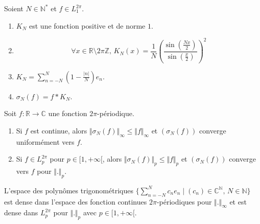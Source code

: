 	\begin{proposition}
		Soient $N \in \mathbb{N}^*$ et $f \in L_1^{2 \pi}$.
		\begin{enumerate}[label=(\roman*)]
			\item $K_N$ est une fonction positive et de norme $1$.
			\item \[ \forall x \in \mathbb{R} \setminus 2 \pi \mathbb{Z}, \, K_N(x) = \frac{1}{N} \left(\frac{\sin \left( \frac{Nx}{2} \right)}{\sin \left( \frac{x}{2} \right)}\right)^2 \]
			\item $K_N = \sum_{n=-N}^{N} \left(1 - \frac{\vert n \vert}{N}\right) e_n$.
			\item $\sigma_N(f) = f * K_N$.
		\end{enumerate}
	\end{proposition}


	\begin{theorem}[Fejér]
		Soit $f : \mathbb{R} \rightarrow \mathbb{C}$ une fonction $2\pi$-périodique.
		\begin{enumerate}[label=(\roman*)]
			\item Si $f$ est continue, alors $\Vert \sigma_N(f) \Vert_\infty \leq \Vert f \Vert_\infty$ et $(\sigma_N(f))$ converge uniformément vers $f$.
			\item Si $f \in L_p^{2\pi}$ pour $p \in [1,+\infty[$, alors $\Vert \sigma_N(f) \Vert_p \leq \Vert f \Vert_p$ et $(\sigma_N(f))$ converge vers $f$ pour $\Vert . \Vert_p$.
		\end{enumerate}
	\end{theorem}

	\begin{corollary}
		L'espace des polynômes trigonométriques $\{ \sum_{n=-N}^N c_n e_n \mid (c_n) \in \mathbb{C}^{\mathbb{N}}, \, N \in \mathbb{N} \}$ est dense dans l'espace des fonction continues $2\pi$-périodiques pour $\Vert . \Vert_\infty$ et est dense dans $L_p^{2\pi}$ pour $\Vert . \Vert_p$ avec $p \in [1,+\infty[$.
	\end{corollary}

